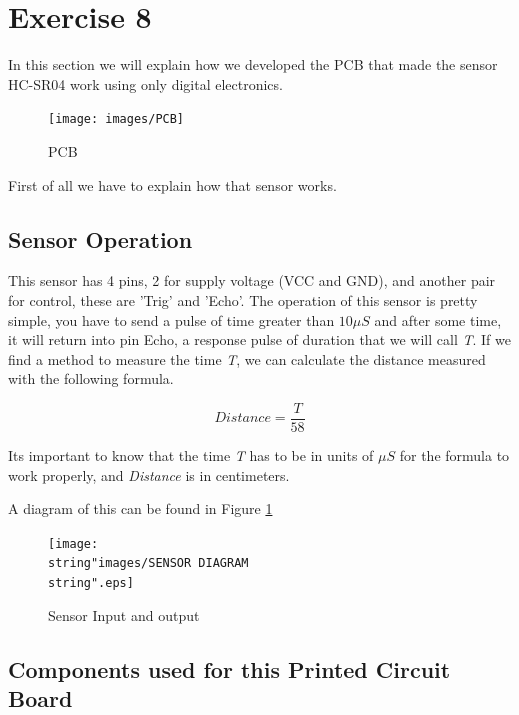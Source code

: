 \section{Exercise 8}

In this section we will explain how we developed the PCB that made
the sensor HC-SR04 work using only digital electronics. 

\begin{figure}[H]
\begin{centering}
\texttt{[image: images/PCB]}
\par\end{centering}
\caption{PCB}
\end{figure}

First of all we have to explain how that sensor works.

\subsection{Sensor Operation}

This sensor has 4 pins, 2 for supply voltage (VCC and GND), and another
pair for control, these are 'Trig' and 'Echo'. The operation of this
sensor is pretty simple, you have to send a pulse of time greater
than $10\mu S$ and after some time, it will return into pin Echo,
a response pulse of duration that we will call \emph{T}. If we find
a method to measure the time \emph{T}, we can calculate the distance
measured with the following formula.

\[
Distance=\frac{T}{58}
\]

Its important to know that the time \emph{T }has to be in units of
$\mu S$ for the formula to work properly, and \emph{Distance }is
in centimeters.

A diagram of this can be found in Figure \ref{8_2}

\begin{figure}[H]
\begin{centering}
\texttt{[image: \\string"images/SENSOR DIAGRAM\\string".eps]}
\par\end{centering}
\caption{Sensor Input and output}
\label{8_2}

\end{figure}

\subsection{Components used for this Printed Circuit Board}

